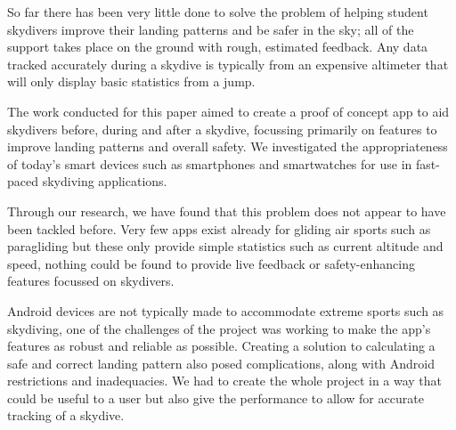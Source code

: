 So far there has been very little done to solve the problem of helping student skydivers improve their landing patterns and be safer in the sky; all of the support takes place on the ground with rough, estimated feedback. Any data tracked accurately during a skydive is typically from an expensive altimeter that will only display basic statistics from a jump.

The work conducted for this paper aimed to create a proof of concept app to aid skydivers before, during and after a skydive, focussing primarily on features to improve landing patterns and overall safety. We investigated the appropriateness of today's smart devices such as smartphones and smartwatches for use in fast-paced skydiving applications.

Through our research, we have found that this problem does not appear to have been tackled before. Very few apps exist already for gliding air sports such as paragliding but these only provide simple statistics such as current altitude and speed, nothing could be found to provide live feedback or safety-enhancing features focussed on skydivers.

Android devices are not typically made to accommodate extreme sports such as skydiving, one of the challenges of the project was working to make the app's features as robust and reliable as possible. Creating a solution to calculating a safe and correct landing pattern also posed complications, along with Android restrictions and inadequacies. We had to create the whole project in a way that could be useful to a user but also give the performance to allow for accurate tracking of a skydive.

